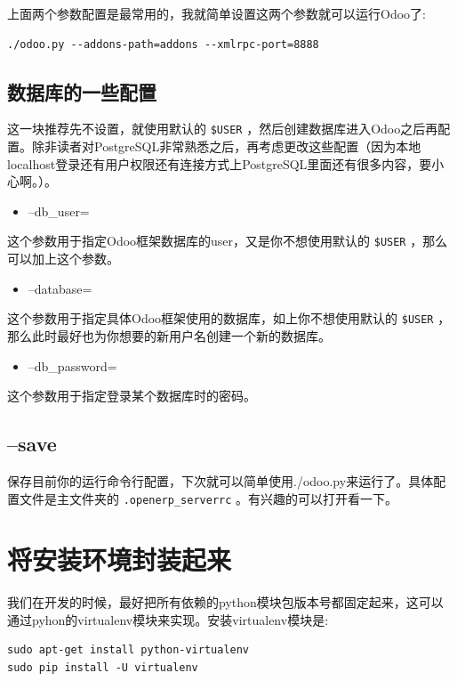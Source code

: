 \documentclass[11pt,a4paper]{sphinxmanual}
\begin{document}
上面两个参数配置是最常用的，我就简单设置这两个参数就可以运行Odoo了: 

\begin{Verbatim}
./odoo.py --addons-path=addons --xmlrpc-port=8888
\end{Verbatim}


\subsection{数据库的一些配置}
\label{sec-3-5-3}
这一块推荐先不设置，就使用默认的 \verb~$USER~ ，然后创建数据库进入Odoo之后再配置。除非读者对PostgreSQL非常熟悉之后，再考虑更改这些配置（因为本地localhost登录还有用户权限还有连接方式上PostgreSQL里面还有很多内容，要小心啊。）。

\begin{itemize}
\item --db\_user=
\end{itemize}
这个参数用于指定Odoo框架数据库的user，又是你不想使用默认的 \verb~$USER~ ，那么可以加上这个参数。

\begin{itemize}
\item --database=
\end{itemize}
这个参数用于指定具体Odoo框架使用的数据库，如上你不想使用默认的 \verb~$USER~ ，那么此时最好也为你想要的新用户名创建一个新的数据库。

\begin{itemize}
\item --db\_password=
\end{itemize}
这个参数用于指定登录某个数据库时的密码。

\subsection{--save}
\label{sec-3-5-4}
保存目前你的运行命令行配置，下次就可以简单使用./odoo.py来运行了。具体配置文件是主文件夹的 \verb~.openerp_serverrc~ 。有兴趣的可以打开看一下。 



\section{将安装环境封装起来}
\label{sec-3-6}
我们在开发的时候，最好把所有依赖的python模块包版本号都固定起来，这可以通过pyhon的virtualenv模块来实现。安装virtualenv模块是:
\begin{verbatim}
sudo apt-get install python-virtualenv
sudo pip install -U virtualenv
\end{verbatim}
\end{document}
